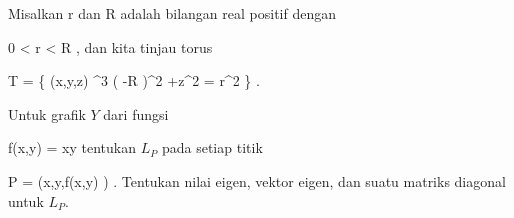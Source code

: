 {}
{

Misalkan
\mathkor {} {r} {dan} {R} {}
adalah bilangan real positif dengan

\mavergleichskette
{\vergleichskette
{ 0
}
{ < }{ r
}
{ < }{ R
}
{    }{
}
{   }{
}
}
{}{}{,}
dan kita tinjau torus
 {} {}

\mavergleichskettedisp
{\vergleichskette
{ T
}
{ =} { \left\{ (x,y,z) \in \R^3  \mid   \left(   -R  \right)^2 +z^2  = r^2         \right\}
}
{ } {
}
{ } {
}
{ } {
}
}
{}{}{.}

}
{} {}

{}
{

Untuk grafik $Y$ dari fungsi

\mavergleichskettedisp
{\vergleichskette
{ f(x,y)
}
{ =} { xy
}
{ } {
}
{ } {
}
{ } {
}
}
{}{}{}
tentukan
$L_P$ pada setiap titik

\mavergleichskettedisp
{\vergleichskette
{ P
}
{ =} { (x,y,f(x,y) )
}
{ } {
}
{ } {
}
{ } {
}
}
{}{}{.}
Tentukan nilai eigen, vektor eigen, dan suatu matriks diagonal untuk $L_P$.

}
{} {}

